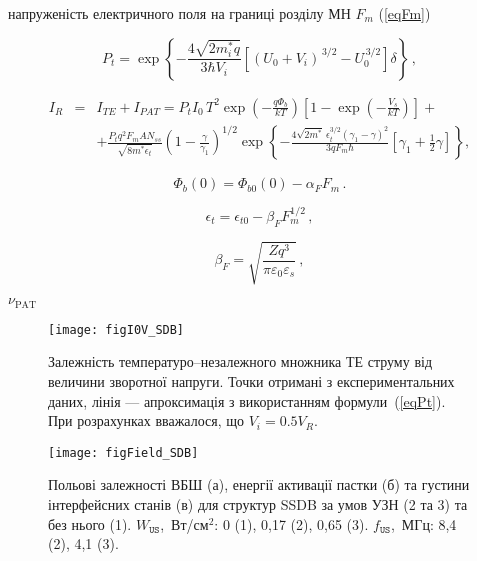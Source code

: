 \documentclass[a4paper,14pt,oneside,openany]{memoir}
\begin{document}
напруженість електричного поля на границі розділу МН
$F_m$ (\ref{eqFm})

\begin{equation}\label{eqPt}
    P_t=\exp\left\{-\frac{4\sqrt{2m_i^*q}}{3\hbar V_i}\left[(U_0+V_i)^{\,3/2}-U_0^{\,3/2}\right]\delta\right\}\,,
\end{equation}

\begin{eqnarray}
\label{eqIgen}
 I_R&=&I_{TE}+I_{PAT}=P_tI_0\,T^2\exp\left(-\frac{q\Phi_b}{kT}\right)\left[1-\exp\left(-\frac{V_s}{kT}\right)\right]+\\
 &&+\frac{P_tq^2F_mAN_{ss}}{\sqrt{8m^*\epsilon_t}}\left(1-\frac{\gamma}{\gamma_1}\right)^{1/2}\exp
    \left\{-\frac{4\sqrt{2m^*}\,\epsilon_t^{3/2}\left(\gamma_1-\gamma\right)^2}{3qF_m\hbar}
    [\gamma_1+\frac{1}{2}\gamma]\right\}\nonumber,
\end{eqnarray}



\begin{equation}\label{eqFbE}
    \Phi_{b}(0)=\Phi_{b0}(0)-\alpha_{F} F_m\,.
\end{equation}


\begin{equation}\label{eqEtE}
    \epsilon_t=\epsilon_{t0}-\beta_F F_m^{1/2}\,,
\end{equation}

\begin{equation}\label{eqBetta}
    \beta_F=\sqrt{\frac{Zq^3}{\pi\varepsilon_0\varepsilon_s}}\,,
\end{equation}


$\nu_\mathrm{PAT}$

\begin{figure}
\center
\texttt{[image: figI0V\_SDB]}
\caption{\label{figI0V_SDB}
Залежність температуро--незалежного множника ТЕ струму від величини зворотної напруги.
Точки отримані з експериментальних даних,
лінія --- апроксимація з використанням формули~(\ref{eqPt}).
При розрахунках вважалося, що $V_i=0.5V_R$.
}%
\end{figure}

\begin{figure}
\center
\texttt{[image: figField\_SDB]}
\caption{\label{figField_SDB}
Польові залежності ВБШ (а), енергії активації пастки (б) та густини інтерфейсних станів (в) для структур SSDB за умов УЗН (2 та 3) та без нього (1).
$W_\mathtt{US}$,~Вт/см$^2$: 0 (1), 0,17 (2), 0,65 (3).
$f_\mathtt{US}$,~МГц: 8,4 (2), 4,1 (3).
}%
\end{figure}
\end{document}
